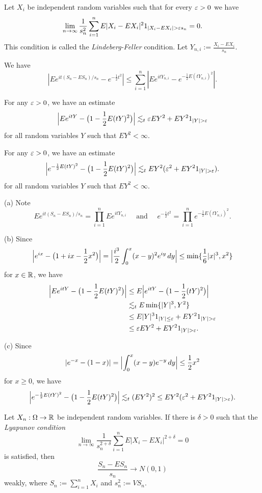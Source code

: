 \documentclass{../../large}
\begin{document}
\begin{prb}
Let $X_i$ be independent random variables such that for every $\varepsilon>0$ we have
\[\lim_{n\to\infty}\frac1{s_n^2}\sum_{i=1}^nE|X_i-EX_i|^21_{|X_i-EX_i|>\e s_n}=0.\]
This condition is called the \emph{Lindeberg-Feller} condition.
Let $Y_{n,i}:=\frac{X_i-EX_i}{s_n}$.
\begin{parts}
\item We have
\[|Ee^{it(S_n-ES_n)/s_n}-e^{-\frac12t^2}|\le\sum_{i=1}^n|Ee^{itY_{n,i}}-e^{-\frac12E(tY_{n,i})^2}|.\]
\item For any $\varepsilon>0$, we have an estimate
\[\Bigl|Ee^{itY}-\bigl(1-\frac12E(tY)^2\bigr)\Bigr|\lesssim_t\e EY^2+EY^21_{|Y|>\e}\]
for all random variables $Y$ such that $EY^2<\infty$.
\item For any $\varepsilon>0$, we have an estimate
\[\Bigl|e^{-\frac12E(tY)^2}-\bigl(1-\frac12E(tY)^2\bigr)\Bigr|
\lesssim_tEY^2(\e^2+EY^21_{|Y|>\e}).\]
for all random variables $Y$ such that $EY^2<\infty$.
\item
\end{parts}
\end{prb}
\begin{pf}
(a)
Note
\[Ee^{it(S_n-ES_n)/s_n}=\prod_{i=1}^nEe^{itY_{n,i}}\quad\text{ and }\quad e^{-\frac12t^2}=\prod_{i=1}^ne^{-\frac12E(tY_{n,i})^2}.\]

(b)
Since
\[\Bigl|e^{ix}-\bigl(1+ix-\frac12x^2\bigr)\Bigr|=\Bigl|\frac{i^3}2\int_0^x(x-y)^2e^{iy}\,dy\Bigr|\le\min\{\frac16|x|^3,x^2\}\]
for $x\in\mathbb{R}$, we have
\begin{align*}
\Bigl|Ee^{itY}-\bigl(1-\frac12E(tY)^2\bigr)\Bigr|
&\le E\Bigl|e^{itY}-\bigl(1-\frac12(tY)^2\bigr)\Bigr|\\
&\lesssim_t E\min\{|Y|^3,Y^2\}\\
&\le E|Y|^31_{|Y|\le\e}+EY^21_{|Y|>\e}\\
&\le\e EY^2+EY^21_{|Y|>\e}.
\end{align*}

(c)
Since
\[|e^{-x}-(1-x)|=\Bigl|\int_0^x(x-y)e^{-y}\,dy\Bigr|\le\frac12x^2\]
for $x\ge0$, we have
\[\Bigl|e^{-\frac12E(tY)^2}-\bigl(1-\frac12E(tY)^2\bigr)\Bigr|
\lesssim_t(EY^2)^2\le EY^2(\e^2+EY^21_{|Y|>\e}).\]
\end{pf}

\begin{prb}
Let $X_n:\Omega\to\mathbb{R}$ be independent random variables.
If there is $\delta>0$ such that the \emph{Lyapunov condition}
\[\lim_{n\to\infty}\frac1{s_n^{2+\delta}}\sum_{i=1}^nE|X_i-EX_i|^{2+\delta}=0\]
is satisfied, then
\[\frac{S_n-ES_n}{s_n}\to N(0,1)\]
weakly, where $S_n:=\sum_{i=1}^nX_i$ and $s_n^2:=VS_n$.
\end{prb}
\end{document}

